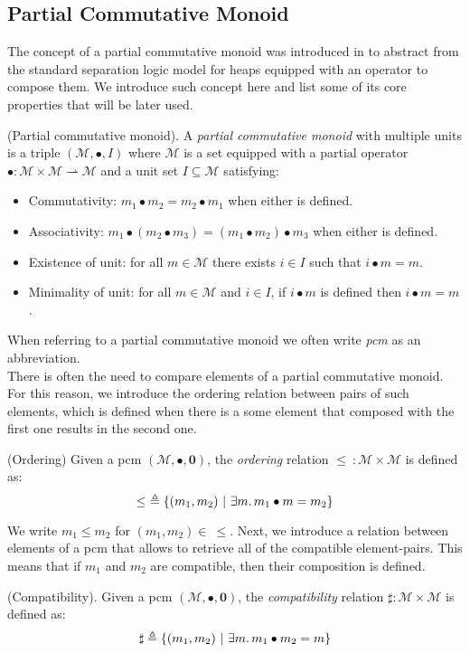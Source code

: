 \subsection{Partial Commutative Monoid}

The concept of a partial commutative monoid was introduced in \cite{sepalgebra} to abstract from the standard separation logic model for heaps equipped with an operator to compose them. We introduce such concept here and list some of its core properties that will be later used.

\begin{defn}
	(Partial commutative monoid).
	A \emph{partial commutative monoid} with multiple units \cite{views} is a triple $(\mathcal{M}, \bullet, I)$ where $\mathcal{M}$ is a set equipped with a partial operator $\bullet : \mathcal{M} \times \mathcal{M} \rightharpoonup \mathcal{M}$ and a unit set $I \subseteq \mathcal{M}$ satisfying:
	\begin{itemize}
		\item Commutativity: $m_1 \bullet m_2 = m_2 \bullet m_1$ when either is defined.
		\item Associativity: $m_1 \bullet (m_2 \bullet m_3) = (m_1 \bullet m_2) \bullet m_3$ when either is defined.
		\item Existence of unit: for all $m \in \mathcal{M}$ there exists $i \in I$ such that $i \bullet m = m$.
		\item Minimality of unit: for all $m \in \mathcal{M}$ and $i \in I$, if $i \bullet m$ is defined then $i \bullet m = m$.
	\end{itemize}
\end{defn}
When referring to a partial commutative monoid we often write \emph{pcm} as an abbreviation. \\

There is often the need to compare elements of a partial commutative monoid. For this reason, we introduce the ordering relation between pairs of such elements, which is defined when there is a some element that composed with the first one results in the second one.
\begin{defn}
	(Ordering)
	Given a pcm $(\mathcal{M}, \bullet, \mathbf{0})$, the \emph{ordering} relation $\leq\ : \mathcal{M} \times \mathcal{M}$ is defined as:
\[
	\leq\ \triangleq \{ (m_1, m_2)\ |\ \exists m \ldotp m_1 \bullet m = m_2 \}
\]
\end{defn}
We write $m_1 \leq m_2$ for $(m_1, m_2) \in\ \leq$. Next, we introduce a relation between elements of a pcm that allows to retrieve all of the compatible element-pairs. This means that if $m_1$ and $m_2$ are compatible, then their composition is defined.

\begin{defn}
	(Compatibility).
	Given a pcm $(\mathcal{M}, \bullet, \mathbf{0})$, the \emph{compatibility} relation $\sharp : \mathcal{M} \times \mathcal{M}$ is defined as:
\[
	\sharp \triangleq \{ (m_1, m_2)\ |\ \exists m \ldotp m_1 \bullet m_2 = m \}
\]
\end{defn}